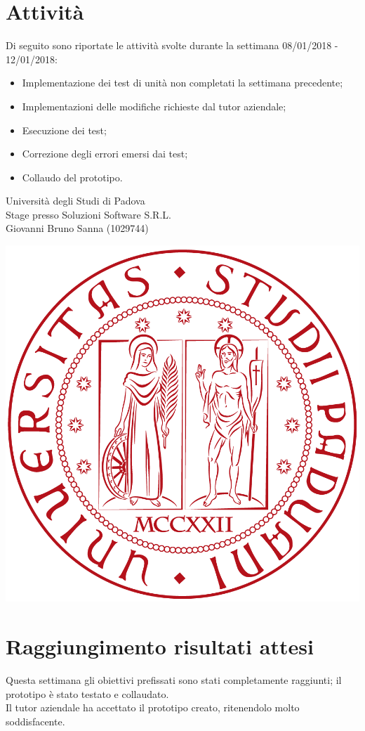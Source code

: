 \documentclass[11pt,notitlepage]{article}
\newcommand{\nomeStudente}{Giovanni Bruno}
\newcommand{\cognomeStudente}{Sanna}
\newcommand{\matricolaStudente}{1029744}
\newcommand{\ragioneSocAzienda}{Soluzioni Software S.R.L.}
\begin{document}
\bigskip
\section*{Attività}
Di seguito sono riportate le attività svolte durante la settimana 08/01/2018 - 12/01/2018:
\begin{itemize}
		\item Implementazione dei test di unità non completati la settimana precedente;
		\item Implementazioni delle modifiche richieste dal tutor aziendale;
		\item Esecuzione dei test;
		\item Correzione degli errori emersi dai test;
		\item Collaudo del prototipo.
\end{itemize}


\newpage
\noindent
\parbox{0.7\columnwidth}{Università degli Studi di Padova\\
	Stage presso \ragioneSocAzienda{}\\
	\nomeStudente{} \cognomeStudente{} (\matricolaStudente{})}%
\parbox{0.3\columnwidth}{
	\hfill \includegraphics[scale=0.08]{immagini/logo-unipd.png}}

\bigskip
\section*{Raggiungimento risultati attesi}
Questa settimana gli obiettivi prefissati sono stati completamente raggiunti; il prototipo è stato testato e collaudato. \\ Il tutor aziendale ha accettato il prototipo creato, ritenendolo molto soddisfacente.
 
 
\end{document}
